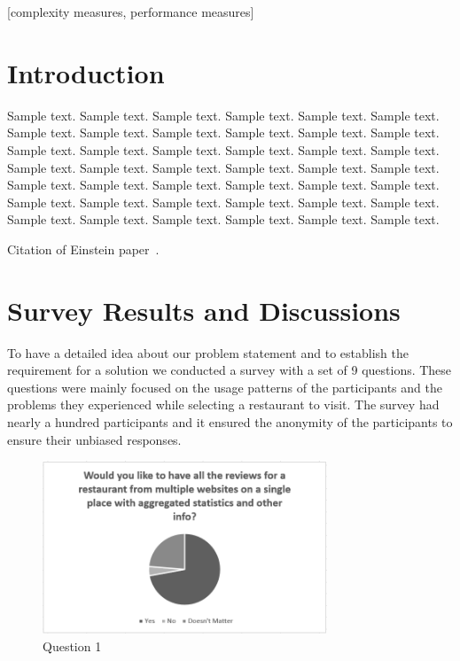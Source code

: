 \documentclass{acm_proc_article-sp}
\begin{document}
[complexity measures, performance measures]



\section{Introduction}
Sample text. Sample text. Sample text. Sample text. Sample text. Sample text. 
Sample text. Sample text. Sample text. Sample text. Sample text. Sample text. 
Sample text. Sample text. Sample text. Sample text. Sample text. Sample text. 
Sample text. Sample text. Sample text. Sample text. Sample text. Sample text. 
Sample text. Sample text. Sample text. Sample text. Sample text. Sample text. 
Sample text. Sample text. Sample text. Sample text. Sample text. Sample text. 
Sample text. Sample text. Sample text. Sample text. Sample text. Sample text. 

Citation of Einstein paper~\cite{Einstein}.

\section{Survey Results and Discussions}
To have a detailed idea about our problem statement and to establish the requirement for a solution we conducted a survey with a set of 9 questions. These questions were mainly focused on the usage patterns of the participants and the problems they experienced while selecting a restaurant to visit. The survey had nearly a hundred participants and it ensured the anonymity of the participants to ensure their unbiased responses.

\begin{figure}[htp]
\centering
\includegraphics[width=8.5cm]{need_web}
\caption{Question 1}
\label{fig:question1}
\end{figure}
\end{document}
